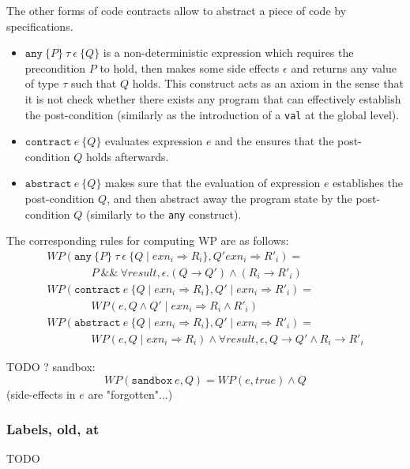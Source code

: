 The other forms of code contracts allow to abstract a piece of code by specifications.
\begin{itemize}
\item $\texttt{any}~\{ P \}~\tau~\epsilon~\{ Q \}$ is a
  non-deterministic expression which requires the precondition $P$ to
  hold, then makes some side effects $\epsilon$ and returns any value
  of type $\tau$ such that $Q$ holds. This construct acts as an axiom
  in the sense that it is not check whether there exists any program
  that can effectively establish the post-condition (similarly as the
  introduction of a \texttt{val} at the global level).
\item $\texttt{contract}~e~\{ Q \}$ evaluates expression $e$ and the
  ensures that the post-condition $Q$ holds afterwards.
\item $\texttt{abstract}~e~\{ Q \}$ makes sure that the evaluation of
  expression $e$ establishes the post-condition $Q$, and then abstract
  away the program state by the post-condition $Q$ (similarly to the
  \texttt{any} construct).
\end{itemize}
The corresponding rules for computing WP are as follows:
\[
\begin{array}{l}
  WP(\texttt{any}~\{ P \}~\tau~\epsilon~\{ Q \mid exn_i \Rightarrow R_i \} ,
  Q'  exn_i \Rightarrow R'_i) = \\
  \qquad\qquad P \mathop{\&\&} \forall result, \epsilon.
  (Q \rightarrow Q') \land (R_i \rightarrow R'_i) \\
  WP(\texttt{contract}~e~\{ Q \mid exn_i \Rightarrow R_i \} ,
  Q' \mid exn_i \Rightarrow R'_i) = \\
  \qquad\qquad WP(e,Q \land Q' \mid exn_i \Rightarrow R_i \land R'_i) \\
  WP(\texttt{abstract}~e~\{ Q \mid exn_i \Rightarrow R_i \} ,
  Q' \mid exn_i \Rightarrow R'_i) = \\
  \qquad\qquad WP(e,Q \mid exn_i \Rightarrow R_i) \land
  \forall result, \epsilon, Q \rightarrow Q' \land R_i \rightarrow R'_i
\end{array}
\]

TODO ? sandbox:
\[
WP(\texttt{sandbox}~e, Q) = WP(e,true) \land Q
\]
(side-effects in $e$ are "forgotten"...)

\subsubsection{Labels, old, at}

TODO

